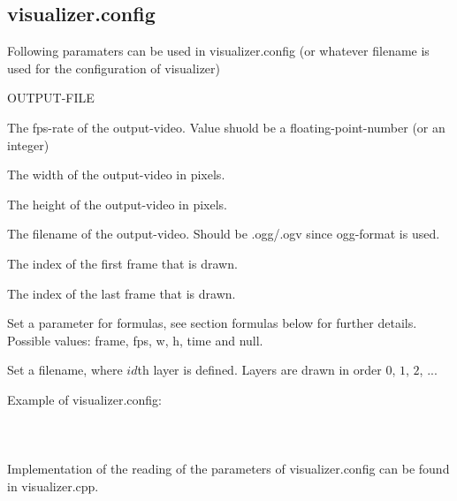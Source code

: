 \documentclass{article}
\begin{document}
    \subsection{visualizer.config}
      Following paramaters can be used in visualizer.config (or whatever filename is used for the configuration of visualizer)
      \begin{labeling}{OUTPUT-FILE}
        \item [FPS]         The fps-rate of the output-video. Value shuold be a floating-point-number (or an integer)
        \item [W or WIDTH]  The width of the output-video in pixels.
        \item [H or HEIGHT] The height of the output-video in pixels.
        \item [OUTPUT-FILE] The filename of the output-video. Should be .ogg/.ogv since ogg-format is used.
        \item [FIRST-FRAME] The index of the first frame that is drawn.
        \item [LAST-FRAME]  The index of the last frame that is drawn.
        \item [FPV\#id]     Set a parameter for formulas, see section formulas below for further details.
                            Possible values: frame, fps, w, h, time and null.
        \item [LAYER\#id]   Set a filename, where $id$th layer is defined. Layers are drawn in order $0$, $1$, $2$, ...
      \end{labeling}
      
      Example of visualizer.config: \\ \\
       \\ \\
      Implementation of the reading of the parameters of visualizer.config can be found in visualizer.cpp.
\end{document}
